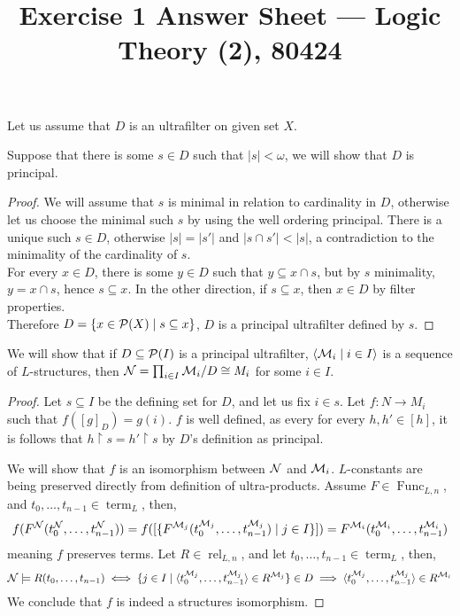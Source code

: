 
\title{Exercise 1 Answer Sheet --- Logic Theory (2), 80424}


\maketitle
\maketitleprint{}

\question{}
Let us assume that $D$ is an ultrafilter on given set $X$.

\subquestion{}
Suppose that there is some $s \in D$ such that $|s| < \omega$, we will show that $D$ is principal.
\begin{proof}
	We will assume that $s$ is minimal in relation to cardinality in $D$, otherwise let us choose the minimal such $s$ by using the well ordering principal.
	There is a unique such $s \in D$, otherwise $|s| = |s'|$ and $|s \cap s'| < |s|$, a contradiction to the minimality of the cardinality of $s$. \\
	For every $x \in D$, there is some $y \in D$ such that $y \subseteq x \cap s$, but by $s$ minimality, $y = x \cap s$, hence $s \subseteq x$.
	In the other direction, if $s \subseteq x$, then $x \in D$ by filter properties. \\
	Therefore $D = \{ x \in \mathcal{P}(X) \mid s \subseteq x \}$, $D$ is a principal ultrafilter defined by $s$.
\end{proof}

\subquestion{}
We will show that if $D \subseteq \mathcal{P}(I)$ is a principal ultrafilter, $\langle \mathcal{M}_i \mid i \in I \rangle$ is a sequence of $L$-structures, then $\mathcal{N} = \prod_{i \in I} \mathcal{M}_i / D \cong M_i$ for some $i \in I$.
\begin{proof}
	Let $s \subseteq I$ be the defining set for $D$, and let us fix $i \in s$.
	Let $f : N \to M_i$ such that $f({[g]}_D) = g(i)$.
	$f$ is well defined, as every for every $h, h' \in [h]$, it is follows that $h \restriction s = h' \restriction s$ by $D$'s definition as principal.

	We will show that $f$ is an isomorphism between $\mathcal{N}$ and $\mathcal{M}_i$.
	$L$-constants are being preserved directly from definition of ultra-products.
	Assume $F \in \operatorname{Func}_{L, n}$, and $t_0, \dots, t_{n - 1} \in \operatorname{term}_L$, then,
	\[
		f(F^{\mathcal{N}}(t_0^{\mathcal{N}}, \dots, t_{n - 1}^{\mathcal{N}}))
		= f([\{ F^{\mathcal{M}_j}(t_0^{\mathcal{M}_j}, \dots, t_{n - 1}^{\mathcal{M}_j}) \mid j \in I \}])
		= F^{\mathcal{M}_i}(t_0^{\mathcal{M}_i}, \dots, t_{n - 1}^{\mathcal{M}_i})
	\]
	meaning $f$ preserves terms.
	Let $R \in \operatorname{rel}_{L, n}$, and let $t_0, \dots, t_{n - 1} \in \operatorname{term}_L$, then,
	\[
		\mathcal{N} \models R(t_0, \dots, t_{n - 1})
		\iff \{ j \in I \mid \langle t_0^{\mathcal{M}_j}, \dots, t_{n - 1}^{\mathcal{M}_j} \rangle \in R^{\mathcal{M}_j} \} \in D
		\implies \langle t_0^{\mathcal{M}_j}, \dots, t_{n - 1}^{\mathcal{M}_j} \rangle \in R^{\mathcal{M}_i}
	\]
	We conclude that $f$ is indeed a structures isomorphism.
\end{proof}

